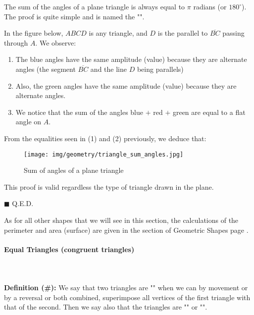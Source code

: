 	\begin{theorem}
	The sum of the angles of a plane triangle is always equal to $\pi$ radians (or $180^\circ$). The proof is quite simple and is named the "\label{angle sum theorem}".
	\end{theorem}
	\begin{dem}
	In the figure below, $ABCD$ is any triangle, and $D$ is the parallel to $\overline{BC}$ passing through $A$. We observe:
	\begin{enumerate}
		\item The blue angles have the same amplitude (value) because they are alternate angles (the segment $\overline{BC}$ and the line $D$ being parallels)

		\item Also, the green angles have the same amplitude (value) because they are alternate angles.

		\item We notice that the sum of the angles blue $+$ red $+$ green are equal to a flat angle on $A$.
	\end{enumerate}
	From the equalities seen in (1) and (2) previously, we deduce that:
	
	\begin{figure}[H]
		\centering
		\texttt{[image: img/geometry/triangle\_sum\_angles.jpg]}
		\caption{Sum of angles of a plane triangle}
	\end{figure}
	This proof is valid regardless the type of triangle drawn in the plane.
	\begin{flushright}
		$\blacksquare$  Q.E.D.
	\end{flushright}
	\end{dem}
	As for all other shapes that we will see in this section, the calculations of the perimeter and area (surface) are given in the section of Geometric Shapes page \pageref{known surfaces}.
	
	\paragraph{Equal Triangles (congruent triangles)}\mbox{}\\\\
	\textbf{Definition (\#\mydef):} We say that two triangles are "" when we can by movement or by a reversal or both combined, superimpose all vertices of the first triangle with that of the second. Then we say also that the triangles are "" or "".


